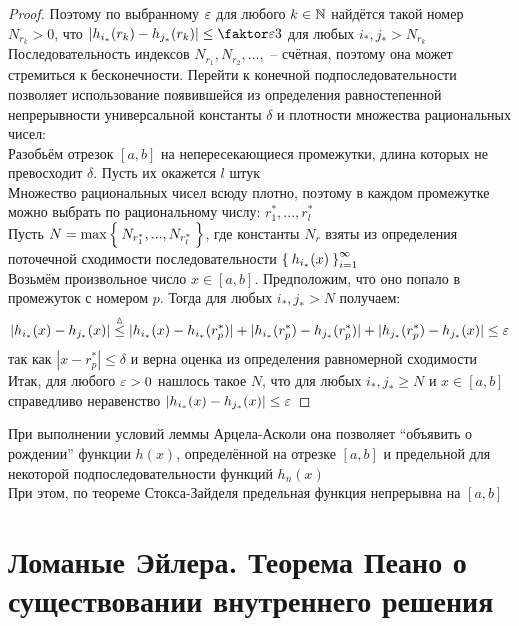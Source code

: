\begin{proof}
    Поэтому по выбранному $ \varepsilon $ для любого $ k \in \mathbb{N} $ найдётся такой номер $ N_{r_k} > 0 $, что $ |h_{i_*}(r_k) - h_{j_*}(r_k)| \le \faktor\veps3 $ для любых $ i_*, j_* > N_{r_k} $ \\
    Последовательность индексов $ N_{r_1}, N_{r_2}, ..., $ -- счётная, поэтому она может стремиться к бесконечности. Перейти к конечной подпоследовательности позволяет использование появившейся из определения равностепенной непрерывности универсальной константы $ \delta $ и плотности множества рациональных чисел: \\
    Разобьём отрезок $ [a, b] $ на непересекающиеся промежутки, длина которых не превосходит $ \delta $. Пусть их окажется $ l $ штук \\
    Множество рациональных чисел всюду плотно, поэтому в каждом промежутке можно выбрать по рациональному числу: $ r_1^*, ..., r_l^* $ \\
    Пусть $ N = \max\Set{N_{r_1^*}, ..., N_{r_l^*}} $, где константы $ N_r $ взяты из определения поточечной сходимости последовательности $ \Set{h_{i_*}(x)}_{i=1}^{\infty} $ \\
    Возьмём произвольное число $ x \in [a, b] $. Предположим, что оно попало в промежуток с номером $ p $. Тогда для любых $ i_*, j_* > N $ получаем:
    $$ |h_{i_*}(x) - h_{j_*}(x)| \stackrel\vartriangle\le |h_{i_*}(x) - h_{i_*}(r_p^*)| + |h_{i_*}(r_p^*) - h_{j_*}(r_p^*)| + |h_{j_*}(r_p^*) - h_{j_*}(x)| \le \varepsilon $$
    так как $ |x - r_p^*| \le \delta $ и верна оценка из определения равномерной сходимости \\
    Итак, для любого $ \varepsilon > 0 $ нашлось такое $ N $, что для любых $ i_*, j_* \ge N $ и $ x \in [a, b] $ справедливо неравенство $ |h_{i_*}(x) - h_{j_*}(x)| \le \varepsilon $
\end{proof}

\begin{remark}
	При выполнении условий леммы Арцела-Асколи она позволяет ``объявить о рождении'' функции $ h(x) $, определённой на отрезке $ [a, b] $ и предельной для некоторой подпоследовательности функций $ h_n(x) $ \\
    При этом, по теореме Стокса-Зайделя предельная функция непрерывна на $ [a, b] $
\end{remark}

\section{Ломаные Эйлера. Теорема Пеано о существовании внутреннего решения}

